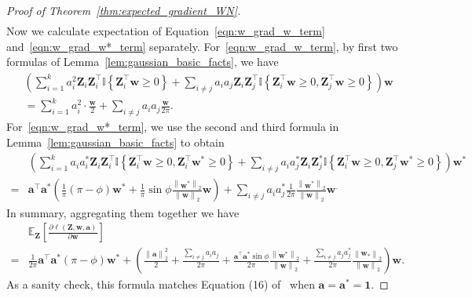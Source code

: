 \documentclass{article}
\newcommand{\secondlayer}{a}
\newcommand{\mat}[1]{\mathbf{#1}}
\newcommand{\vect}[1]{\mathbf{#1}}
\newcommand{\norm}[1]{\left\|#1\right\|}
\newcommand{\expect}{\mathbb{E}}
\newcommand{\indict}{\mathbb{I}}
\begin{document}
\begin{proof}[Proof of Theorem~\ref{thm:expected_gradient_WN}]
\begin{align}
\end{align}
Now we calculate expectation of Equation~\eqref{eqn:w_grad_w_term} and~\eqref{eqn:w_grad_w*_term} separately.
For~\eqref{eqn:w_grad_w_term}, by first two formulas of Lemma~\ref{lem:gaussian_basic_facts}, we have \begin{align*}
&\left(\sum_{i=1}^{k}\secondlayer_i^2\mat{Z}_i\mat{Z}_i^\top\indict\left\{\mat{Z}_i^\top \vect{w}\ge 0\right\}+\sum_{i\neq j}\secondlayer_i\secondlayer_j\mat{Z}_i\mat{Z}_j^\top\indict\left\{\mat{Z}_i^\top\vect{w}\ge 0,\mat{Z}_j^\top\vect{w} \ge 0 \right\}\right)\vect{w} \\
& = \sum_{i=1}^{k}\secondlayer_i^2\cdot\frac{\vect{w}}{2} + \sum_{i\neq j}\secondlayer_i\secondlayer_j\frac{\vect{w}}{2\pi}.
\end{align*}
For~\eqref{eqn:w_grad_w*_term}, we use the second and third formula in Lemma~\ref{lem:gaussian_basic_facts} to obtain\begin{align*}
&\left(\sum_{i=1}^{k}\secondlayer_i\secondlayer_i^*\mat{Z}_i\mat{Z}_i^\top
\indict\left\{\mat{Z}_i^\top\vect{w}\ge 0,\mat{Z}_i^\top\vect{w}^*\ge 0\right\}
+ \sum_{i\neq j}\secondlayer_i\secondlayer_j^*\mat{Z}_i\mat{Z}_j^*\indict\left\{\mat{Z}_i^\top\vect{w}\ge 0,\mat{Z}_j^\top \vect{w}^* \ge 0\right\}\right)\vect{w}^* \\
= & \vect{\secondlayer}^\top\vect{\secondlayer}^*\left(\frac{1}{\pi}\left(\pi-\phi\right)\vect{w}^* + \frac{1}{\pi}\sin\phi\frac{\norm{\vect{w}^*}_2}{\norm{\vect{w}}_2}\vect{w}\right) + \sum_{i \neq j}\secondlayer_i\secondlayer_j^*\frac{1}{2\pi}\frac{\norm{\vect{w}^*}_2}{\norm{\vect{w}}_2}\vect{w}^.
\end{align*}
In summary, aggregating them together we have\begin{align*}
&\expect_{\mat{Z}}\left[\frac{\partial \ell\left(\mat{Z},\vect{w},\vect{\secondlayer}\right)}{\partial \vect{w}}\right] \\
= &\frac{1}{2\pi}\vect{\secondlayer}^\top \vect{\secondlayer}^*\left(\pi-\phi\right)\vect{w}^* + \left(
\frac{\norm{\vect{\secondlayer}}_2^2}{2} + \frac{\sum_{i\neq j}\secondlayer_i\secondlayer_j}{2\pi} + \frac{\vect{\secondlayer}^\top\vect{\secondlayer}^*\sin\phi}{2\pi}\frac{\norm{\vect{w}^*}_2}{\norm{\vect{w}}_2} + \frac{\sum_{i\neq j}\secondlayer_j\secondlayer_j^*}{2\pi}\frac{\norm{\vect{w}_*}_2}{\norm{\vect{w}}_2}
\right)\vect{w}.
\end{align*}
As a sanity check, this formula matches Equation (16) of~\citep{brutzkus2017globally} when $\vect{\secondlayer}=\vect{\secondlayer}^*=\vect{1}$.


\end{proof}
\end{document}
